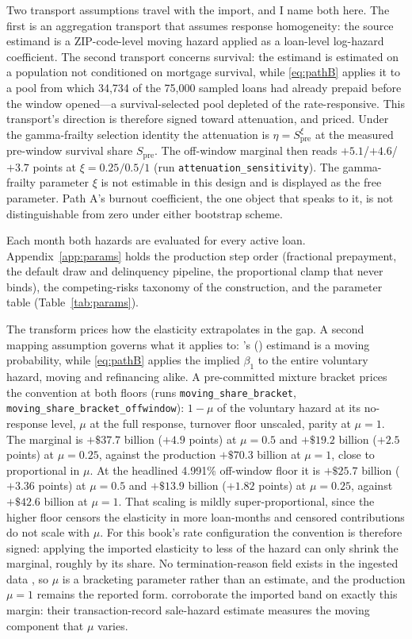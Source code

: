 \documentclass[12pt]{article}
\newcommand{\citepos}[1]{\citeauthor{#1}'s (\citeyear{#1})}
\begin{document}
Two transport assumptions travel with the import, and I name both here. The first is an aggregation transport that assumes response homogeneity: the source estimand is a ZIP-code-level moving hazard applied as a loan-level log-hazard coefficient. The second transport concerns survival: the estimand is estimated on a population not conditioned on mortgage survival, while \eqref{eq:pathB} applies it to a pool from which 34,734 of the 75,000 sampled loans had already prepaid before the window opened---a survival-selected pool depleted of the rate-responsive. This transport's direction is therefore signed toward attenuation, and priced. Under the gamma-frailty selection identity the attenuation is $\eta = S_{\mathrm{pre}}^{\xi}$ at the measured pre-window survival share $S_{\mathrm{pre}}$. The off-window marginal then reads $+5.1$/$+4.6$/$+3.7$ points at $\xi = 0.25/0.5/1$ (run \texttt{attenuation\_sensitivity}). The gamma-frailty parameter $\xi$ is not estimable in this design and is displayed as the free parameter. Path A's burnout coefficient, the one object that speaks to it, is not distinguishable from zero under either bootstrap scheme.

Each month both hazards are evaluated for every active loan. Appendix~\ref{app:params} holds the production step order (fractional prepayment, the default draw and delinquency pipeline, the proportional clamp that never binds), the competing-risks taxonomy of the construction, and the parameter table (Table~\ref{tab:params}).

The transform prices how the elasticity extrapolates in the gap. A second mapping assumption governs what it applies to: \citepos{liebersohn2024} estimand is a moving probability, while \eqref{eq:pathB} applies the implied $\beta_1$ to the entire voluntary hazard, moving and refinancing alike. A pre-committed mixture bracket prices the convention at both floors (runs \texttt{moving\_share\_bracket}, \texttt{moving\_share\_bracket\_offwindow}): $1-\mu$ of the voluntary hazard at its no-response level, $\mu$ at the full response, turnover floor unscaled, parity at $\mu = 1$. The marginal is $+\$37.7$ billion ($+4.9$ points) at $\mu = 0.5$ and $+\$19.2$ billion ($+2.5$ points) at $\mu = 0.25$, against the production $+\$70.3$ billion at $\mu = 1$, close to proportional in $\mu$. At the headlined 4.991\% off-window floor it is $+\$25.7$ billion ($+3.36$ points) at $\mu = 0.5$ and $+\$13.9$ billion ($+1.82$ points) at $\mu = 0.25$, against $+\$42.6$ billion at $\mu = 1$. That scaling is mildly super-proportional, since the higher floor censors the elasticity in more loan-months and censored contributions do not scale with $\mu$. For this book's rate configuration the convention is therefore signed: applying the imported elasticity to less of the hazard can only shrink the marginal, roughly by its share. No termination-reason field exists in the ingested data \citep[cf.][on the refinancing-versus-moving mix]{amromin2020}, so $\mu$ is a bracketing parameter rather than an estimate, and the production $\mu = 1$ remains the reported form. \citet{graybill2026} corroborate the imported band on exactly this margin: their transaction-record sale-hazard estimate measures the moving component that $\mu$ varies.
\end{document}
